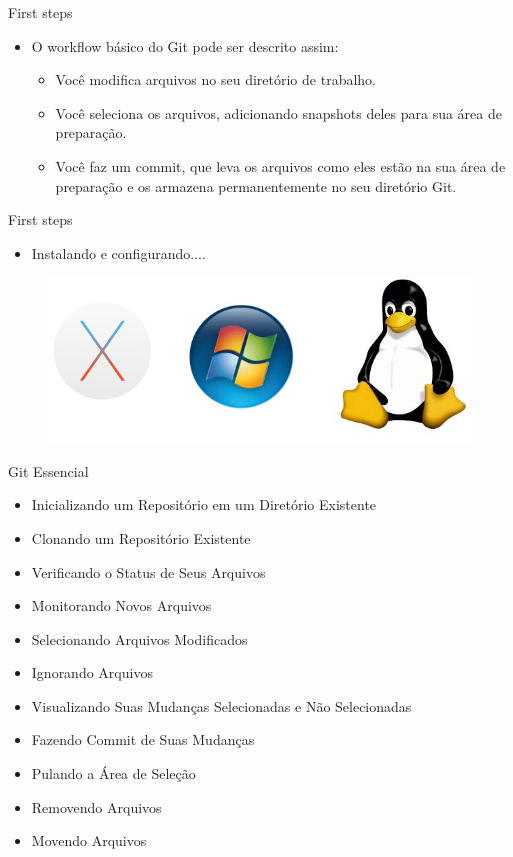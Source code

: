 \documentclass[t]{beamer}
\begin{document}
\begin{frame} {First steps}
	\begin{itemize}
		\item O workflow básico do Git pode ser descrito assim:
		\begin{itemize}
			\item Você modifica arquivos no seu diretório de trabalho.
			\item Você seleciona os arquivos, adicionando snapshots deles para sua área de preparação.
			\item Você faz um commit, que leva os arquivos como eles estão na sua área de preparação e os armazena permanentemente no seu diretório Git.
		\end{itemize}
	\end{itemize}
\end{frame}
	
\begin{frame} {First steps}
	\begin{itemize}
		\item Instalando e configurando....		
	\end{itemize}
	
	\begin{figure}[tb!]
		\centering
		\includegraphics[scale=0.6,keepaspectratio=true]{logos.png}
	\end{figure}
	
\end{frame}

\begin{frame} {Git Essencial}
	\begin{itemize}
		\item Inicializando um Repositório em um Diretório Existente
		\item Clonando um Repositório Existente
		\item Verificando o Status de Seus Arquivos
		\item Monitorando Novos Arquivos
		\item Selecionando Arquivos Modificados
		\item Ignorando Arquivos
		\item Visualizando Suas Mudanças Selecionadas e Não Selecionadas
		\item Fazendo Commit de Suas Mudanças
		\item Pulando a Área de Seleção
		\item Removendo Arquivos
		\item Movendo Arquivos

	\end{itemize}
\end{frame}
\end{document}

